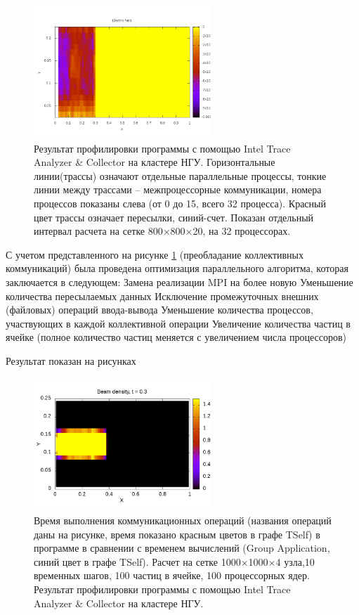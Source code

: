 \begin{figure}[h]
\begin{center}
\includegraphics[height=5cm,keepaspectratio]{images/scalingNSU-img8.png}
\caption{
Результат профилировки программы с помощью Intel Trace Analyzer \& Collector на кластере НГУ. Горизонтальные линии(трассы) означают отдельные параллельные процессы, тонкие линии между трассами – межпроцессорные коммуникации, номера процессов показаны слева (от 0 до 15, всего 32 процесса). Красный цвет трассы означает пересылки, синий-счет. Показан отдельный интервал расчета на сетке 800×800×20, на 32 процессорах.
}
\label{scale8}
\end{center} 
\end{figure}
	    С учетом представленного на рисунке \ref{scale8} (преобладание коллективных коммуникаций) была проведена оптимизация параллельного алгоритма, которая заключается в следующем:
	    Замена реализации MPI на более новую
	    Уменьшение количества пересылаемых данных
	    Исключение промежуточных внешних (файловых) операций ввода-вывода
	    Уменьшение количества процессов, участвующих в каждой коллективной операции
	    Увеличение количества частиц в ячейке (полное количество частиц меняется с увеличением числа процессоров)
	   
	    Результат показан на рисунках 
\begin{figure}[h]
	\begin{center}
		\includegraphics[height=5cm,keepaspectratio]{images/scalingNSU-img9.png}
		\caption{
		 Время выполнения коммуникационных операций (названия операций даны на рисунке, время показано красным цветов в графе TSelf) в программе в сравнении с временем вычислений (Group Application, синий цвет в графе TSelf). Расчет на сетке 1000×1000×4 узла,10 временных шагов, 100 частиц в ячейке,  100 процессорных ядер. Результат профилировки программы с помощью Intel Trace Analyzer \& Collector на кластере НГУ.
		}
		\label{scale9}
	\end{center} 
\end{figure}	    
	   
